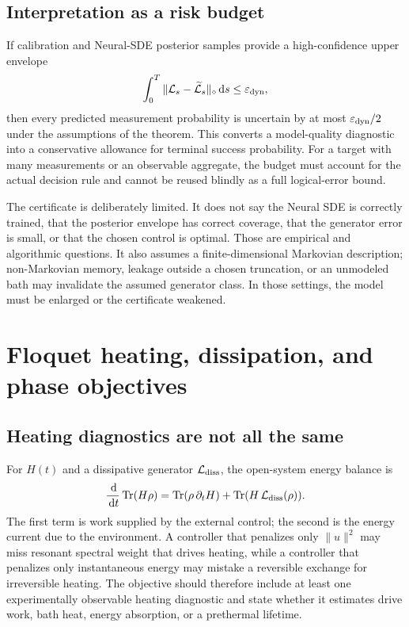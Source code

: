 \documentclass[10pt,twoside]{article}
\DeclareMathOperator{\Tr}{Tr}
\newcommand{\Lind}{\mathcal L}
\newcommand{\dd}{\,\mathrm d}
\newcommand{\eps}{\varepsilon}
\begin{document}
\subsection{Interpretation as a risk budget}

If calibration and Neural-SDE posterior samples provide a high-confidence upper envelope
\begin{equation}
\int_0^T\|\Lind_s-\widetilde{\Lind}_s\|_\diamond\dd s\leq\eps_{\rm dyn},
\end{equation}
then every predicted measurement probability is uncertain by at most $\eps_{\rm dyn}/2$ under the assumptions of the theorem. This converts a model-quality diagnostic into a conservative allowance for terminal success probability. For a target with many measurements or an observable aggregate, the budget must account for the actual decision rule and cannot be reused blindly as a full logical-error bound.

The certificate is deliberately limited. It does not say the Neural SDE is correctly trained, that the posterior envelope has correct coverage, that the generator error is small, or that the chosen control is optimal. Those are empirical and algorithmic questions. It also assumes a finite-dimensional Markovian description; non-Markovian memory, leakage outside a chosen truncation, or an unmodeled bath may invalidate the assumed generator class. In those settings, the model must be enlarged or the certificate weakened.

\section{Floquet heating, dissipation, and phase objectives}

\subsection{Heating diagnostics are not all the same}

For $H(t)$ and a dissipative generator $\Lind_{\rm diss}$, the open-system energy balance is
\begin{equation}
\frac{\dd}{\dd t}\Tr(H\rho)
=\Tr(\rho\,\partial_t H)+\Tr(H\,\Lind_{\rm diss}(\rho)).
\label{eq:energybalance}
\end{equation}
The first term is work supplied by the external control; the second is the energy current due to the environment. A controller that penalizes only $\|u\|^2$ may miss resonant spectral weight that drives heating, while a controller that penalizes only instantaneous energy may mistake a reversible exchange for irreversible heating. The objective should therefore include at least one experimentally observable heating diagnostic and state whether it estimates drive work, bath heat, energy absorption, or a prethermal lifetime.
\end{document}

